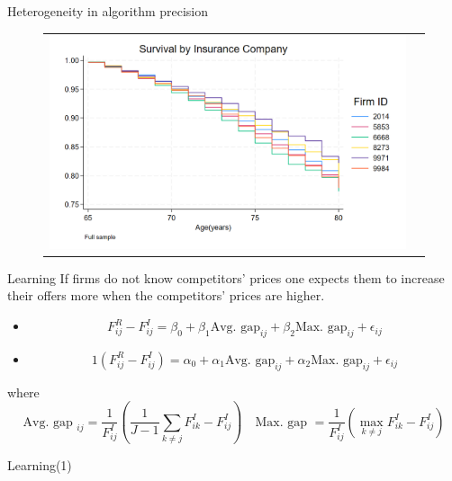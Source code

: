 \documentclass[10pt,aspectratio=169]{beamer}
\begin{document}
\begin{frame}{Heterogeneity in algorithm precision}\label{slide:fig3}    
\begin{figure}[H]
\centering{}%
\begin{tabular}{cc}
\includegraphics[scale=0.2964]{../figures/IE6/IE6_survival_year_all.png}
\end{tabular}
\end{figure}
\hyperlink{slide:Descriptive_evidence}{}
\end{frame}


\begin{frame}{Learning} 
    If firms do not know competitors' prices one expects them to increase their offers more when the competitors' prices are higher. 
    \begin{itemize}
        \item $$ F_{ij}^R - F_{ij}^I = \beta_0 + \beta_1 \text{Avg. gap}_{ij} + \beta_2 \text{Max. gap}_{ij} + \epsilon_{ij}$$

        \item $$ 1(F_{ij}^R  - F_{ij}^I)  = \alpha_0 + \alpha_1 \text{Avg. gap}_{ij} + \alpha_2 \text{Max. gap}_{ij} + \epsilon_{ij}$$
    \end{itemize}
    where  $$ \text{Avg. gap }_{ij} = \frac{1}{F_{ij}^I}\left(\frac{1}{J-1}\sum_{k \neq j} F_{ik}^I - F_{ij}^I\right) \quad \text{Max. gap } = \frac{1}{F_{ij}^I}\left(\max_{k \neq j} F_{ik}^I - F_{ij}^I\right)$$
    
\end{frame}


\begin{frame}{Learning(1)}\label{slide:fig4}    
\scalebox{0.8}{
    
}

\hyperlink{slide:Descriptive_evidence}{}
\end{frame}
\end{document}
